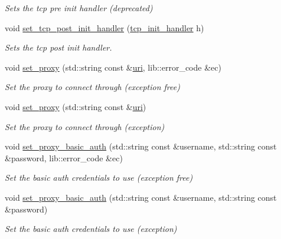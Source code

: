\begin{DoxyCompactItemize}
\begin{DoxyCompactList}\small\item\em Sets the tcp pre init handler (deprecated) \end{DoxyCompactList}\item 
void \hyperlink{classwebsocketpp_1_1transport_1_1asio_1_1connection_a069b63faee90061ed4fa4e66d221ac18}{set\+\_\+tcp\+\_\+post\+\_\+init\+\_\+handler} (\hyperlink{namespacewebsocketpp_1_1transport_1_1asio_ad12345b8638872037c87db068467233d}{tcp\+\_\+init\+\_\+handler} h)
\begin{DoxyCompactList}\small\item\em Sets the tcp post init handler. \end{DoxyCompactList}\item 
void \hyperlink{classwebsocketpp_1_1transport_1_1asio_1_1connection_a9638063c7c8c90c74d97008dacd81095}{set\+\_\+proxy} (std\+::string const \&\hyperlink{classwebsocketpp_1_1uri}{uri}, lib\+::error\+\_\+code \&ec)
\begin{DoxyCompactList}\small\item\em Set the proxy to connect through (exception free) \end{DoxyCompactList}\item 
void \hyperlink{classwebsocketpp_1_1transport_1_1asio_1_1connection_a8bd4c1b8ffbe04230249567e3217acfb}{set\+\_\+proxy} (std\+::string const \&\hyperlink{classwebsocketpp_1_1uri}{uri})
\begin{DoxyCompactList}\small\item\em Set the proxy to connect through (exception) \end{DoxyCompactList}\item 
void \hyperlink{classwebsocketpp_1_1transport_1_1asio_1_1connection_a99ee9d4f4043a2e3b2225cb1f03a56d1}{set\+\_\+proxy\+\_\+basic\+\_\+auth} (std\+::string const \&username, std\+::string const \&password, lib\+::error\+\_\+code \&ec)
\begin{DoxyCompactList}\small\item\em Set the basic auth credentials to use (exception free) \end{DoxyCompactList}\item 
void \hyperlink{classwebsocketpp_1_1transport_1_1asio_1_1connection_a0a42cbcc12974d71c0ea91d12da6b72e}{set\+\_\+proxy\+\_\+basic\+\_\+auth} (std\+::string const \&username, std\+::string const \&password)
\begin{DoxyCompactList}\small\item\em Set the basic auth credentials to use (exception) \end{DoxyCompactList}\item 

\end{DoxyCompactItemize}
